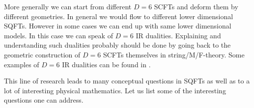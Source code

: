 \documentclass[12pt]{article}
\begin{document}
More generally we can start from different $D=6$ SCFTs and deform them by different geometries. In general we would flow to different lower dimensional SQFTs. However in some cases we can end up with same lower dimensional models. In this case we can speak of $D=6$ IR dualities. Explaining and understanding such dualities probably should be done by going back to the geometric construction of $D=6$ SCFTs themselves in string/M/F-theory. Some examples of $D=6$ IR dualities can be found in \cite{Ohmori:2015pua,Ohmori:2015pia,Kim:2018bpg,Razamat:2019vfd,Baume:2021qho}. 

This line of research leads to many conceptual questions in SQFTs as well as to a lot of interesting physical mathematics. Let us list some of the interesting questions one can address. 
\end{document}
